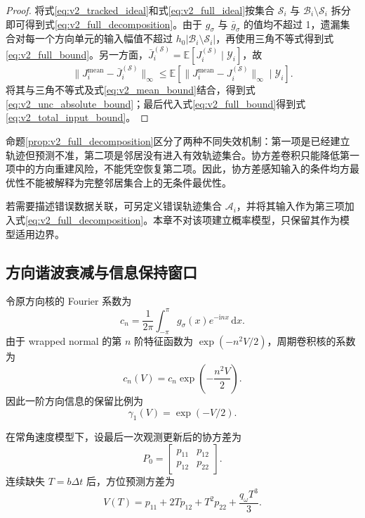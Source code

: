 \documentclass[UTF8,fontset=windows,11pt]{ctexart}
\theoremstyle{cnplain}
\numberwithin{equation}{section}
\newcommand{\E}{\mathbb E}
\begin{document}
\begin{proof}
将式\eqref{eq:v2_tracked_ideal}和式\eqref{eq:v2_full_ideal}按集合 $\mathcal S_i$ 与 $\mathcal B_i\setminus\mathcal S_i$ 拆分即可得到式\eqref{eq:v2_full_decomposition}。由于 $g_\sigma$ 与 $\bar g_\sigma$ 的值均不超过 1，遗漏集合对每一个方向单元的输入幅值不超过 $h_0|\mathcal B_i\setminus\mathcal S_i|$，再使用三角不等式得到式\eqref{eq:v2_full_bound}。另一方面，$\bar J_i^{(\mathcal S)}=\E[J_i^{(\mathcal S)}\mid\mathcal Y_i]$，故
\[
 \|J_i^{\mathrm{mean}}-\bar J_i^{(\mathcal S)}\|_\infty
 \le\E[\|J_i^{\mathrm{mean}}-J_i^{(\mathcal S)}\|_\infty\mid\mathcal Y_i].
\]
将其与三角不等式及式\eqref{eq:v2_mean_bound}结合，得到式\eqref{eq:v2_unc_absolute_bound}；最后代入式\eqref{eq:v2_full_bound}得到式\eqref{eq:v2_total_input_bound}。
\end{proof}

命题\ref{prop:v2_full_decomposition}区分了两种不同失效机制：第一项是已经建立轨迹但预测不准，第二项是邻居没有进入有效轨迹集合。协方差卷积只能降低第一项中的方向重建风险，不能凭空恢复第二项。因此，协方差感知输入的条件均方最优性不能被解释为完整邻居集合上的无条件最优性。

若需要描述错误数据关联，可另定义错误轨迹集合 $\mathcal A_i$，并将其输入作为第三项加入式\eqref{eq:v2_full_decomposition}。本章不对该项建立概率模型，只保留其作为模型适用边界。

\subsection{方向谐波衰减与信息保持窗口}

令原方向核的 Fourier 系数为
\begin{equation}
 c_n=\frac{1}{2\pi}\int_{-\pi}^{\pi}g_\sigma(x)e^{-\mathrm inx}\,\mathrm dx .
 \label{eq:v2_fourier_coeff}
\end{equation}
由于 wrapped normal 的第 $n$ 阶特征函数为 $\exp(-n^2V/2)$，周期卷积核的系数为
\begin{equation}
 c_n(V)=c_n\exp\left(-\frac{n^2V}{2}\right).
 \label{eq:v2_harmonic_decay}
\end{equation}
因此一阶方向信息的保留比例为
\begin{equation}
 \gamma_1(V)=\exp(-V/2).
 \label{eq:v2_first_harmonic}
\end{equation}

在常角速度模型下，设最后一次观测更新后的协方差为
\begin{equation}
 P_0=\begin{bmatrix}p_{11}&p_{12}\\p_{12}&p_{22}\end{bmatrix}.
 \label{eq:v2_p0}
\end{equation}
连续缺失 $T=b\Delta t$ 后，方位预测方差为
\begin{equation}
 V(T)=p_{11}+2Tp_{12}+T^2p_{22}+\frac{q_\omega T^3}{3}.
 \label{eq:v2_vt}
\end{equation}
\end{document}
